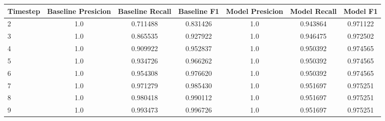 \begin{tabular}{lcccccc}
\toprule
 Timestep &  Baseline Presicion &  Baseline Recall &  Baseline F1 &  Model Presicion &  Model Recall &  Model F1 \\
\midrule
        2 &                 1.0 &         0.711488 &     0.831426 &              1.0 &      0.943864 &  0.971122 \\
        3 &                 1.0 &         0.865535 &     0.927922 &              1.0 &      0.946475 &  0.972502 \\
        4 &                 1.0 &         0.909922 &     0.952837 &              1.0 &      0.950392 &  0.974565 \\
        5 &                 1.0 &         0.934726 &     0.966262 &              1.0 &      0.950392 &  0.974565 \\
        6 &                 1.0 &         0.954308 &     0.976620 &              1.0 &      0.950392 &  0.974565 \\
        7 &                 1.0 &         0.971279 &     0.985430 &              1.0 &      0.951697 &  0.975251 \\
        8 &                 1.0 &         0.980418 &     0.990112 &              1.0 &      0.951697 &  0.975251 \\
        9 &                 1.0 &         0.993473 &     0.996726 &              1.0 &      0.951697 &  0.975251 \\
\bottomrule
\end{tabular}
